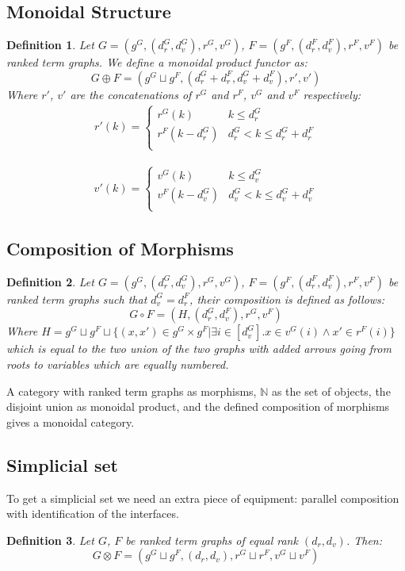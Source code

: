 \documentclass[12pt]{article}
\newtheorem{definition}{Definition}
\newcommand{\N}{\mathbb{N}}
\newcommand{\1}{\mathbbm{1}}
\begin{document}
\subsection{Monoidal Structure}
\begin{definition}
Let $G = (g^G, (d_r^G, d_v^G), r^G, v^G)$, $F = (g^F, (d_r^F, d_v^F), r^F, v^F)$ be ranked term graphs. We define a monoidal product functor as:
$$G \oplus F = \left(g^G \sqcup g^F, (d_r^G + d_r^F, d_v^G + d_v^F), r', v'\right)$$
Where $r'$, $v'$ are the concatenations of $r^G$ and $r^F$, $v^G$ and $v^F$ respectively:
\begin{align*}
    r'(k) = \begin{cases} 
      r^G(k) & k\leq d^G_r\\
      r^F(k-d^G_r)& d^G_r < k \leq d^G_r + d^F_r \\
   \end{cases}
\end{align*}

\begin{align*}
    v'(k) = \begin{cases} 
      v^G(k) & k\leq d^G_v\\
      v^F(k-d^G_v)& d^G_v < k \leq d^G_v + d^F_v \\
   \end{cases}
\end{align*}
\end{definition}

\subsection{Composition of Morphisms}
\begin{definition}
Let $G = (g^G, (d_r^G, d_v^G), r^G, v^G)$, $F = (g^F, (d_r^F, d_v^F), r^F, v^F)$ be ranked term graphs such that $d_v^G = d_r^F$, their composition is defined as follows:
$$G\circ F = (H, (d_r^G, d_v^F), r^G, v^F)$$
Where $H = g^G\sqcup g^F \sqcup\{(x,x') \in g^G\times g^F | \exists i\in[d_v^G]. x\in v^G(i) \wedge x'\in r^F(i)\}$ which is equal to the two union of the two graphs with added arrows going from roots to variables which are equally numbered.
\end{definition}

A category with ranked term graphs as morphisms, $\N$ as the set of objects, the disjoint union as monoidal product, and the defined composition of morphisms gives a monoidal category.
\newpage

\subsection{Simplicial set}
To get a simplicial set we need an extra piece of equipment: parallel composition with identification of the interfaces.
\begin{definition}
    Let $G$, $F$ be ranked term graphs of equal rank $(d_r, d_v)$. Then:
    $$G\otimes F = (g^G\sqcup g^F, (d_r, d_v), r^G \sqcup r^F, v^G \sqcup v^F)$$
\end{definition}
\end{document}

